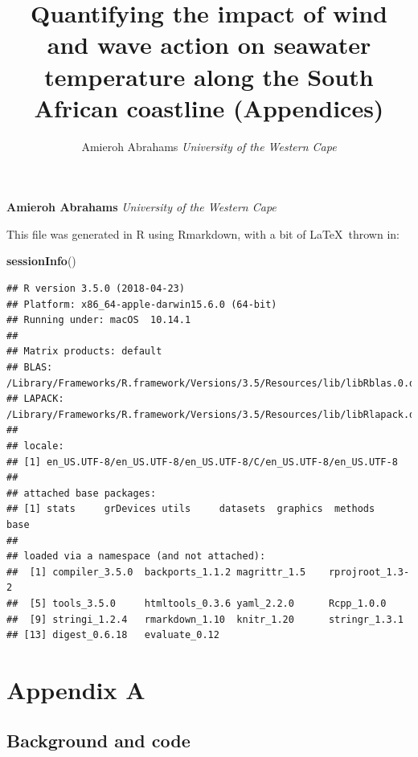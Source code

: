 \documentclass[10pt,A4,]{article}
\title{Quantifying the impact of wind and wave action on seawater temperature
along the South African coastline (Appendices)  }
\author{\Large Amieroh Abrahams\vspace{0.05in} \newline\normalsize\emph{University of the Western Cape}  }
\date{}
\newcommand*{\authorfont}{\fontfamily{phv}\selectfont}
\newenvironment{Shaded}{\begin{snugshade}}{\end{snugshade}}
\newcommand{\KeywordTok}[1]{\textcolor[rgb]{0.13,0.29,0.53}{\textbf{#1}}}
\newcommand{\NormalTok}[1]{#1}
\begin{document}

{%
\setlength{\parindent}{0pt}
\thispagestyle{plain}
{\fontsize{18}{20}\selectfont\raggedright
\maketitle  %
}
{
   \vskip 13.5pt\relax \normalsize\fontsize{11}{12}
\textbf{\authorfont Amieroh Abrahams} \hskip 15pt \emph{\small University of the Western Cape}   
}
}



\vskip 6.5pt

\noindent 

This file was generated in R using Rmarkdown, with a bit of
\LaTeX~thrown in:

\begin{Shaded}
\begin{Highlighting}[]
\KeywordTok{sessionInfo}\NormalTok{()}
\end{Highlighting}
\end{Shaded}

\begin{verbatim}
## R version 3.5.0 (2018-04-23)
## Platform: x86_64-apple-darwin15.6.0 (64-bit)
## Running under: macOS  10.14.1
## 
## Matrix products: default
## BLAS: /Library/Frameworks/R.framework/Versions/3.5/Resources/lib/libRblas.0.dylib
## LAPACK: /Library/Frameworks/R.framework/Versions/3.5/Resources/lib/libRlapack.dylib
## 
## locale:
## [1] en_US.UTF-8/en_US.UTF-8/en_US.UTF-8/C/en_US.UTF-8/en_US.UTF-8
## 
## attached base packages:
## [1] stats     grDevices utils     datasets  graphics  methods   base     
## 
## loaded via a namespace (and not attached):
##  [1] compiler_3.5.0  backports_1.1.2 magrittr_1.5    rprojroot_1.3-2
##  [5] tools_3.5.0     htmltools_0.3.6 yaml_2.2.0      Rcpp_1.0.0     
##  [9] stringi_1.2.4   rmarkdown_1.10  knitr_1.20      stringr_1.3.1  
## [13] digest_0.6.18   evaluate_0.12
\end{verbatim}

\newpage

\section*{\large{Appendix A}}

\subsection*{Background and code}
\end{document}
